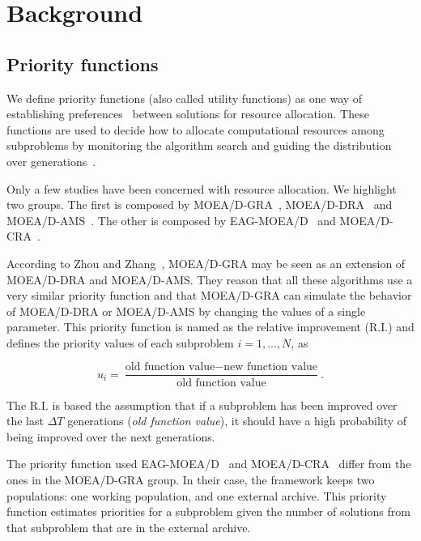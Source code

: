 \section{Background}

\subsection{Priority functions}

We define priority functions (also called utility functions) as one way of establishing preferences~\cite{chankong1983multiobjective} between solutions for resource allocation. These functions are used to decide how to allocate computational resources among subproblems by monitoring the algorithm search and guiding the distribution over generations~\cite{cai2015external}. 

Only a few studies have been concerned with resource allocation. We highlight two groups. The first is composed by MOEA/D-GRA~\cite{zhou2016all}, MOEA/D-DRA~\cite{zhang2009performance} and MOEA/D-AMS~\cite{chiang2011moea}. The other is composed by EAG-MOEA/D~\cite{cai2015external} and MOEA/D-CRA~\cite{kang2018collaborative}.

According to Zhou and Zhang~\cite{zhou2016all}, MOEA/D-GRA may be seen as an extension of MOEA/D-DRA and MOEA/D-AMS. They reason that all these algorithms use a very similar priority function and that MOEA/D-GRA can simulate the behavior of MOEA/D-DRA or MOEA/D-AMS by changing the values of a single parameter. This priority function is named as the relative improvement (R.I.) and defines the priority values of each subproblem $i=1,...,N$, as

\begin{equation}\label{priority}
	u_i = \dfrac{\text{old function value}-\text{new function value}}{\text{old function value}}.
\end{equation}


The R.I. is based the assumption that if a subproblem has been improved over the last $\Delta T$ generations (\textit{old function value}), it should have a high probability of being improved over the next generations. 
	
The priority function used EAG-MOEA/D~\cite{cai2015external} and MOEA/D-CRA~\cite{kang2018collaborative} differ from the ones in the MOEA/D-GRA group. In their case, the framework keeps two populations: one working population, and one external archive. This priority function estimates priorities for a subproblem given the number of solutions from that subproblem that are in the external archive.

